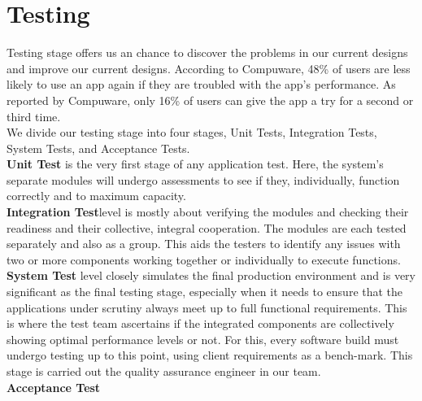 \section{Testing}
Testing stage offers us an chance to discover the problems in our current designs and improve our current designs. 
According to Compuware, 48\% of users are less likely to use an app again if they are troubled with the app’s performance.
As reported by Compuware, only 16\% of users can give the app a try for a second or third time. 
\\
We divide our testing stage into four stages, Unit Tests, Integration Tests, System Tests, and Acceptance Tests.
\\\textbf{Unit Test} is the very first stage of any application test. Here, the system’s separate modules will undergo assessments to see if they, individually, function correctly and to maximum capacity. 
\\\textbf{Integration Test}level is mostly about verifying the modules and checking their readiness and their collective, integral cooperation. The modules are each tested separately and also as a group. This aids the testers to identify any issues with two or more components working together or individually to execute functions.
\\\textbf{System Test} level closely simulates the final production environment and is very significant as the final testing stage, especially when it needs to ensure that the applications under scrutiny always meet up to full functional requirements. 
This is where the test team ascertains if the integrated components are collectively showing optimal performance levels or not. For this, every software build must undergo testing up to this point, using client requirements as a bench-mark. 
This stage is carried out the quality assurance engineer in our team.
\\\textbf{Acceptance Test}



